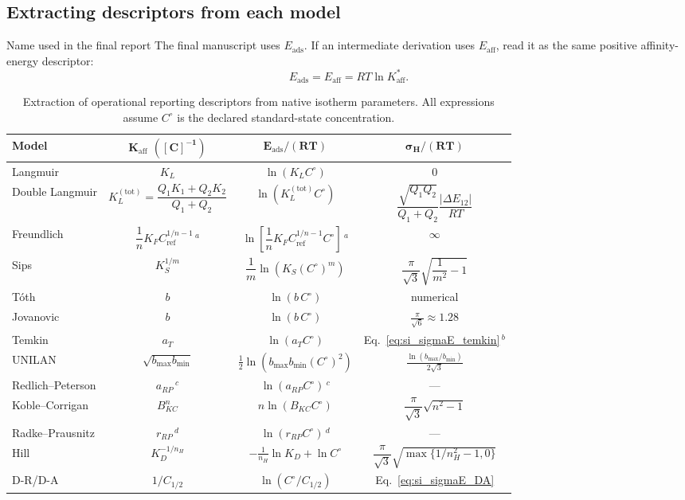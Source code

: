 \documentclass[journal=jacsat,manuscript=article]{achemso}
\begin{document}
\subsection{Extracting descriptors from each model}
\label{sec:si_extraction}

\begin{greenbox}{Name used in the final report}
	The final manuscript uses \(E_{\mathrm{ads}}\). If an intermediate
	derivation uses \(E_{\mathrm{aff}}\), read it as the same positive
	affinity-energy descriptor:
	\[
		E_{\mathrm{ads}}=E_{\mathrm{aff}}
		=RT\ln K_{\mathrm{aff}}^{\ast}.
	\]
\end{greenbox}

\begin{table}[H]
	\centering
	\small
	\caption{Extraction of operational reporting descriptors from native isotherm parameters.  All expressions assume $C^\circ$ is the declared
		standard-state concentration.}
	\label{tab:si_extraction}
	\renewcommand{\arraystretch}{1.5}
	\begin{tabular}{@{} l c c c @{}}
		\toprule
		\textbf{Model}
		& $\boldsymbol{K_{\mathrm{aff}}}$ $\boldsymbol{([C]^{-1})}$
		& $\boldsymbol{E_{\mathrm{ads}}/(RT)}$
		& $\boldsymbol{\sigma_H/(RT)}$ \\
		\midrule
		Langmuir
		& $K_L$
		& $\ln(K_L C^\circ)$
		& $0$ \\
		Double Langmuir
		& $K_L^{\mathrm{(tot)}} = \dfrac{Q_1K_1 + Q_2K_2}{Q_1+Q_2}$
		& $\ln(K_L^{\mathrm{(tot)}} C^\circ)$
		& $\dfrac{\sqrt{Q_1Q_2}}{Q_1+Q_2}\dfrac{|\Delta E_{12}|}{RT}$ \\
		Freundlich
		& $\dfrac{1}{n}K_F C_{\mathrm{ref}}^{1/n-1}$\,$^{a}$
		& $\ln\!\left[\dfrac{1}{n}K_F C_{\mathrm{ref}}^{1/n-1} C^\circ\right]$\,$^{a}$
		& $\infty$ \\
		Sips
		& $K_S^{1/m}$
		& $\dfrac{1}{m}\ln(K_S (C^\circ)^m)$
		& $\dfrac{\pi}{\sqrt{3}}\sqrt{\dfrac{1}{m^2}-1}$ \\
		T\'{o}th
		& $b$
		& $\ln(b\,C^\circ)$
		& numerical \\
		Jovanovic
		& $b$
		& $\ln(b\,C^\circ)$
		& $\frac{\pi}{\sqrt{6}} \approx 1.28$ \\
		Temkin
		& $a_T$
		& $\ln(a_T C^\circ)$
		& Eq.~\ref{eq:si_sigmaE_temkin}\,$^{b}$ \\
		UNILAN
		& $\sqrt{b_{\max}b_{\min}}$
		& $\frac{1}{2}\ln(b_{\max}b_{\min}(C^\circ)^2)$
		& $\frac{\ln(b_{\max}/b_{\min})}{2\sqrt{3}}$ \\
		Redlich--Peterson
		& $a_{RP}$\,$^{c}$
		& $\ln(a_{RP} C^\circ)$\,$^{c}$
		& --- \\
		Koble--Corrigan
		& $B_{KC}^{n}$
		& $n\ln(B_{KC} C^\circ)$
		& $\dfrac{\pi}{\sqrt{3}}\sqrt{n^2-1}$ \\
		Radke--Prausnitz
		& $r_{RP}$\,$^{d}$
		& $\ln(r_{RP} C^\circ)$\,$^{d}$
		& --- \\
		Hill
		& $K_D^{-1/n_H}$
		& $-\frac{1}{n_H}\ln K_D + \ln C^\circ$
		& $\dfrac{\pi}{\sqrt{3}}\sqrt{\max\{1/n_H^2-1,0\}}$ \\
		D-R/D-A
		& $1/C_{1/2}$
		& $\ln(C^\circ/C_{1/2})$
		& Eq.~\ref{eq:si_sigmaE_DA} \\
		\bottomrule
	\end{tabular}


\end{table}
\end{document}

